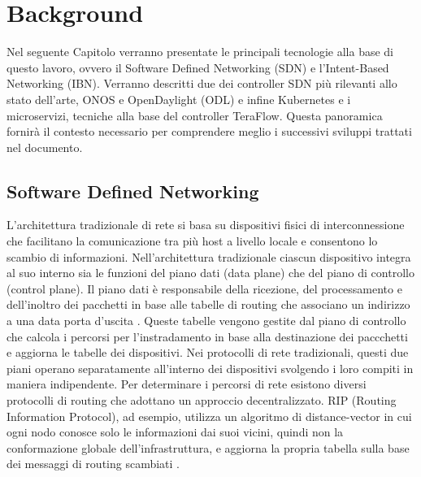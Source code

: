 \chapter{Background}
\label{cap:contesto}
Nel seguente Capitolo verranno presentate le principali tecnologie alla base di questo lavoro, ovvero il Software Defined Networking (SDN) e l'Intent-Based Networking (IBN). 
\newline Verranno descritti due dei controller SDN più rilevanti allo stato dell'arte, ONOS \cite{ONOS} e OpenDaylight (ODL) \cite{ODL} e infine Kubernetes e i microservizi, tecniche alla base del controller TeraFlow.
\newline Questa panoramica fornirà il contesto necessario per comprendere meglio i successivi sviluppi trattati nel documento.
\section{Software Defined Networking}
L'architettura tradizionale di rete si basa su dispositivi fisici di interconnessione che facilitano la comunicazione tra più host a livello locale e consentono lo scambio di informazioni.
Nell'architettura tradizionale ciascun dispositivo integra al suo interno sia le funzioni del piano dati (data plane) che del piano di controllo (control plane). 
\newline Il piano dati è responsabile della ricezione, del processamento e dell'inoltro dei pacchetti in base alle tabelle di routing che associano un indirizzo a una data porta d'uscita \cite{tesiSDN:2020}. 
Queste tabelle vengono gestite dal piano di controllo che calcola i percorsi 
per l'instradamento in base alla destinazione dei paccchetti e aggiorna le tabelle dei dispositivi. 
Nei protocolli di rete tradizionali, questi due piani operano separatamente all'interno dei dispositivi svolgendo i loro compiti in maniera indipendente. 
\newline Per determinare i percorsi di rete esistono diversi protocolli di routing che adottano un approccio decentralizzato.
\newline RIP (Routing Information Protocol), ad esempio, utilizza un algoritmo di distance-vector in cui ogni nodo conosce solo le informazioni dai suoi vicini, quindi non la conformazione globale dell'infrastruttura, e aggiorna la propria tabella sulla base dei messaggi di routing scambiati \cite{rip}.

